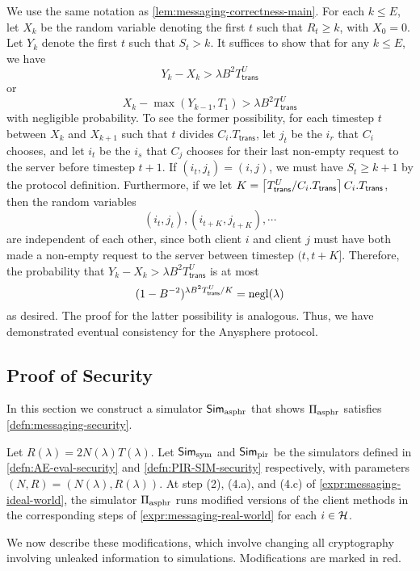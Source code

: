  We use the same notation as \cref{lem:messaging-correctness-main}. For each $k \leq E$, let $X_k$ be the random variable denoting the first $t$ such that $R_t \geq k$, with $X_0 = 0$. Let $Y_k$ denote the first $t$ such that $S_{t} > k$. It suffices to show that for any $k \leq E$, we have
 $$Y_k - X_k > \lambda B^2 T^U_{\mathsf{trans}}$$
 or
 $$X_{k} - \max(Y_{k - 1}, T_1) > \lambda B^2 T^U_{\mathsf{trans}}$$
 with negligible probability. To see the former possibility, for each timestep $t$ between $X_k$ and $X_{k + 1}$ such that $t$ divides $C_i.T_{\mathsf{trans}}$, let $j_t$ be the $i_r$ that $C_i$ chooses, and let $i_t$ be the $i_s$ that $C_j$ chooses for their last non-empty request to the server before timestep $t + 1$. If $(i_t, j_t) = (i, j)$, we must have $S_{t} \geq k + 1$ by the protocol definition. Furthermore, if we let $K = \left\lceil T^U_{\mathsf{trans}} / C_i.T_{\mathsf{trans}} \right\rceil C_i.T_{\mathsf{trans}}$, then the random variables
 $$(i_t, j_t), (i_{t + K}, j_{t + K}), \cdots$$
are independent of each other, since both client $i$ and client $j$ must have both made a non-empty request to the server between timestep $(t, t + K]$. Therefore, the probability that $Y_k - X_k > \lambda B^2 T^U_{\mathsf{trans}}$ is at most
$$(1 - B^{-2})^{\lambda B^2 T^U_{\mathsf{trans}} / K} = \operatorname{negl}(\lambda)$$
as desired. The proof for the latter possibility is analogous. Thus, we have demonstrated eventual consistency for the Anysphere protocol.
\subsection{Proof of Security}
In this section we construct a simulator $\mathsf{Sim}_{\text{asphr}}$ that shows $\Pi_{\text{asphr}}$ satisfies \cref{defn:messaging-security}. 

Let $R(\lambda) = 2N(\lambda)T(\lambda)$. Let $\mathsf{Sim}_{\text{sym}}$ and $\mathsf{Sim}_{\text{pir}}$ be the simulators defined in \cref{defn:AE-eval-security} and \cref{defn:PIR-SIM-security} respectively, with parameters $(N, R) = (N(\lambda), R(\lambda))$. At step (2), (4.a), and (4.c) of \cref{expr:messaging-ideal-world}, the simulator $\Pi_{\text{asphr}}$ runs modified versions of the client methods in the corresponding steps of \cref{expr:messaging-real-world} for each $i \in \mathcal{H}$. 

We now describe these modifications, which involve changing all cryptography involving unleaked information to simulations. Modifications are marked in red.


